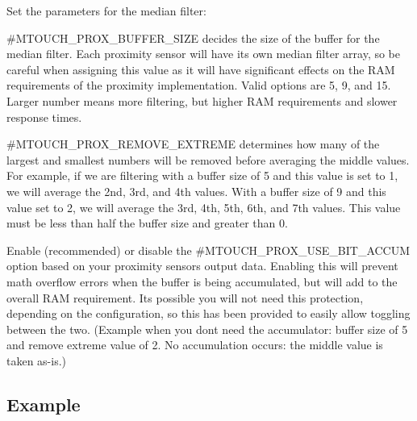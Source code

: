 \begin{DoxyEnumerate}
\begin{DoxyEnumerate}
\item Set the parameters for the median filter\+: 
\begin{DoxyItemize}
\item \#\+M\+T\+O\+U\+C\+H\+\_\+\+P\+R\+O\+X\+\_\+\+B\+U\+F\+F\+E\+R\+\_\+\+S\+I\+Z\+E decides the size of the buffer for the median filter. Each proximity sensor will have its own median filter array, so be careful when assigning this value as it will have significant effects on the R\+A\+M requirements of the proximity implementation. Valid options are 5, 9, and 15. Larger number means more filtering, but higher R\+A\+M requirements and slower response times. 
\item \#\+M\+T\+O\+U\+C\+H\+\_\+\+P\+R\+O\+X\+\_\+\+R\+E\+M\+O\+V\+E\+\_\+\+E\+X\+T\+R\+E\+M\+E determines how many of the largest and smallest numbers will be removed before averaging the middle values. For example, if we are filtering with a buffer size of 5 and this value is set to 1, we will average the 2nd, 3rd, and 4th values. With a buffer size of 9 and this value set to 2, we will average the 3rd, 4th, 5th, 6th, and 7th values. This value must be less than half the buffer size and greater than 0. 
\item Enable (recommended) or disable the \#\+M\+T\+O\+U\+C\+H\+\_\+\+P\+R\+O\+X\+\_\+\+U\+S\+E\+\_\+B\+I\+T\+\_\+\+A\+C\+C\+U\+M option based on your proximity sensor\textquotesingle{}s output data. Enabling this will prevent math overflow errors when the buffer is being accumulated, but will add to the overall R\+A\+M requirement. It\textquotesingle{}s possible you will not need this protection, depending on the configuration, so this has been provided to easily allow toggling between the two. (Example when you don\textquotesingle{}t need the accumulator\+: buffer size of \textquotesingle{}5\textquotesingle{} and remove extreme value of \textquotesingle{}2\textquotesingle{}. No accumulation occurs\+: the middle value is taken as-\/is.) 
\end{DoxyItemize}
\end{DoxyEnumerate}
\end{DoxyEnumerate}\hypertarget{feat_proximity_featProx-Ex}{}\subsection{Example}\label{feat_proximity_featProx-Ex}


